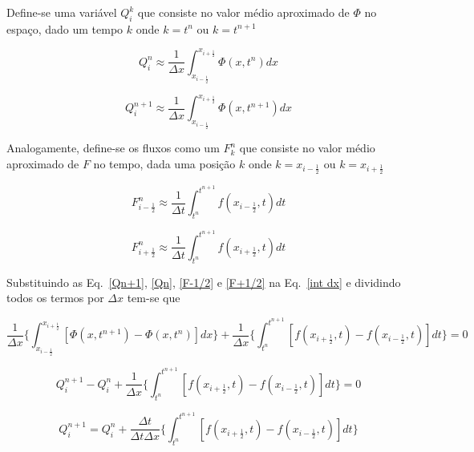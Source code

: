 Define-se uma variável $Q_i^k$ que consiste no valor médio aproximado de $\Phi$
no espaço, dado um tempo $k$ onde $k = t^n$ ou $k = t^{n+1}$

\begin{equation}\label{Qn+1}
    Q_i^n \approx \frac{1}{\Delta x}
    \int_{x_{i-\frac{1}{2}}}^{x_{i+\frac{1}{2}}} \Phi(x,t^n)dx
\end{equation}

\begin{equation}\label{Qn}
    Q_i^{n+1} \approx \frac{1}{\Delta x}
    \int_{x_{i-\frac{1}{2}}}^{x_{i+\frac{1}{2}}} \Phi(x,t^{n+1})dx
\end{equation}

Analogamente, define-se os fluxos como um $F_k^n$ que consiste no valor médio
aproximado de $F$ no tempo, dada uma posição $k$ onde $k = x_{i-\frac{1}{2}}$
ou
$k = x_{i+\frac{1}{2}}$

\begin{equation}\label{F-1/2}
    F_{i-\frac{1}{2}}^n \approx \frac{1}{\Delta t}
    \int_{t^n}^{t^{n+1}} f(x_{i-\frac{1}{2}},t)dt
\end{equation}

\begin{equation}\label{F+1/2}
    F_{i+\frac{1}{2}}^n \approx \frac{1}{\Delta t}
    \int_{t^n}^{t^{n+1}} f(x_{i+\frac{1}{2}},t)dt
\end{equation}

Substituindo as Eq.\ \ref{Qn+1}, \ref{Qn}, \ref{F-1/2} e \ref{F+1/2} na
Eq.\ \ref{int dx} e dividindo todos os termos por $\Delta x$ tem-se que

\begin{equation*}
    \frac{1}{\Delta x} \Bigg\{
    \int_{x_{i-\frac{1}{2}}}^{x_{i+\frac{1}{2}}}[\Phi(x,t^{n+1}) -
    \Phi(x,t^n)]dx
    \Bigg\}
    +
    \frac{1}{\Delta x} \Bigg\{
    \int_{t^n}^{t^{n+1}} [f(x_{i+\frac{1}{2}},t) - f(x_{i-\frac{1}{2}},t)]dt
    \Bigg\}
    = 0
\end{equation*}

\begin{equation*}
    Q_i^{n+1} - Q_i^n + \frac{1}{\Delta x} \Bigg\{
    \int_{t^n}^{t^{n+1}} [f(x_{i+\frac{1}{2}},t) - f(x_{i-\frac{1}{2}},t)]dt
    \Bigg\}
    = 0
\end{equation*}

\begin{equation*}
    Q_i^{n+1} = Q_i^n + \frac{\Delta t}{\Delta t \Delta x} \Bigg\{
    \int_{t^n}^{t^{n+1}} [f(x_{i+\frac{1}{2}},t) - f(x_{i-\frac{1}{2}},t)]dt
    \Bigg\}
\end{equation*}

